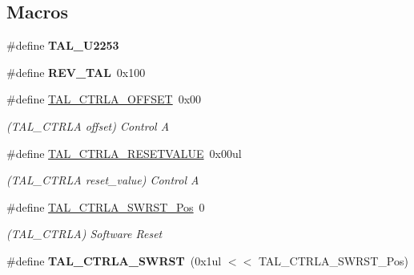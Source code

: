 \subsection*{Macros}
\begin{DoxyCompactItemize}
\item 
\hypertarget{group___s_a_m_l21___t_a_l_ga2529122faf99f58cfa1945c7f66810c4}{}\#define {\bfseries T\+A\+L\+\_\+\+U2253}\label{group___s_a_m_l21___t_a_l_ga2529122faf99f58cfa1945c7f66810c4}

\item 
\hypertarget{group___s_a_m_l21___t_a_l_ga482b973a358bc9c665beca02b00e3fda}{}\#define {\bfseries R\+E\+V\+\_\+\+T\+A\+L}~0x100\label{group___s_a_m_l21___t_a_l_ga482b973a358bc9c665beca02b00e3fda}

\item 
\hypertarget{group___s_a_m_l21___t_a_l_ga0911928d3587b76cc8a7c2def623cf05}{}\#define \hyperlink{group___s_a_m_l21___t_a_l_ga0911928d3587b76cc8a7c2def623cf05}{T\+A\+L\+\_\+\+C\+T\+R\+L\+A\+\_\+\+O\+F\+F\+S\+E\+T}~0x00\label{group___s_a_m_l21___t_a_l_ga0911928d3587b76cc8a7c2def623cf05}

\begin{DoxyCompactList}\small\item\em (T\+A\+L\+\_\+\+C\+T\+R\+L\+A offset) Control A \end{DoxyCompactList}\item 
\hypertarget{group___s_a_m_l21___t_a_l_ga42f29f66311defcf5bb4a695d11d5677}{}\#define \hyperlink{group___s_a_m_l21___t_a_l_ga42f29f66311defcf5bb4a695d11d5677}{T\+A\+L\+\_\+\+C\+T\+R\+L\+A\+\_\+\+R\+E\+S\+E\+T\+V\+A\+L\+U\+E}~0x00ul\label{group___s_a_m_l21___t_a_l_ga42f29f66311defcf5bb4a695d11d5677}

\begin{DoxyCompactList}\small\item\em (T\+A\+L\+\_\+\+C\+T\+R\+L\+A reset\+\_\+value) Control A \end{DoxyCompactList}\item 
\hypertarget{group___s_a_m_l21___t_a_l_gac03e1dc0b7a490b6ecf2bc0ac4dad938}{}\#define \hyperlink{group___s_a_m_l21___t_a_l_gac03e1dc0b7a490b6ecf2bc0ac4dad938}{T\+A\+L\+\_\+\+C\+T\+R\+L\+A\+\_\+\+S\+W\+R\+S\+T\+\_\+\+Pos}~0\label{group___s_a_m_l21___t_a_l_gac03e1dc0b7a490b6ecf2bc0ac4dad938}

\begin{DoxyCompactList}\small\item\em (T\+A\+L\+\_\+\+C\+T\+R\+L\+A) Software Reset \end{DoxyCompactList}\item 
\hypertarget{group___s_a_m_l21___t_a_l_gaf17533c540c36c6522a4282ef1a87c1d}{}\#define {\bfseries T\+A\+L\+\_\+\+C\+T\+R\+L\+A\+\_\+\+S\+W\+R\+S\+T}~(0x1ul $<$$<$ T\+A\+L\+\_\+\+C\+T\+R\+L\+A\+\_\+\+S\+W\+R\+S\+T\+\_\+\+Pos)\label{group___s_a_m_l21___t_a_l_gaf17533c540c36c6522a4282ef1a87c1d}


\end{DoxyCompactItemize}
